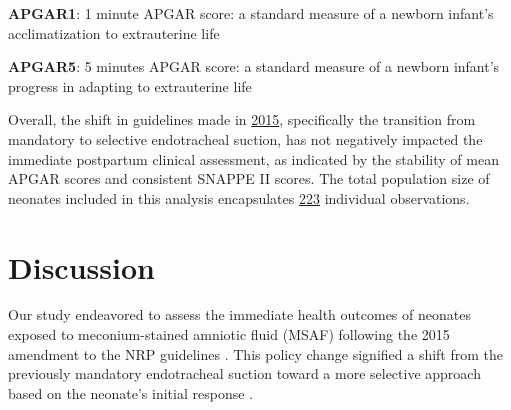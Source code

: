 \documentclass[11pt]{article}
\begin{document}
\begin{table}[h]
\caption{\protect\hyperlink{file-table-2-pkl}{Difference in APGAR scores between pre and post intervention groups using independent t-test}}
\label{table:difference_tests}
\begin{threeparttable}
\renewcommand{\TPTminimum}{\linewidth}
\begin{tablenotes}
\footnotesize
\item \textbf{APGAR1}: 1 minute APGAR score: a standard measure of a newborn infant's acclimatization to extrauterine life
\item \textbf{APGAR5}: 5 minutes APGAR score: a standard measure of a newborn infant's progress in adapting to extrauterine life
\end{tablenotes}
\end{threeparttable}
\end{table}

Overall, the shift in guidelines made in \hyperlink{S0a}{2015}, specifically the transition from mandatory to selective endotracheal suction, has not negatively impacted the immediate postpartum clinical assessment, as indicated by the stability of mean APGAR scores and consistent SNAPPE II scores. The total population size of neonates included in this analysis encapsulates \hyperlink{R0a}{223} individual observations.

\section*{Discussion}

Our study endeavored to assess the immediate health outcomes of neonates exposed to meconium-stained amniotic fluid (MSAF) following the 2015 amendment to the NRP guidelines \cite{Wyckoff2015Part1N}. This policy change signified a shift from the previously mandatory endotracheal suction toward a more selective approach based on the neonate's initial response \cite{Fischer2011APS, Kapoor2020NeonatalR}.
\end{document}
